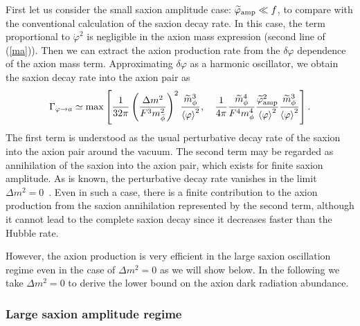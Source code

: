 \documentclass[12pt, a4paper]{article}
\begin{document}
First let us consider the small saxion amplitude case: $\widetilde \varphi_{\rm amp} \ll f$, to compare with the conventional calculation
of the saxion decay rate.
In this case, the term proportional to $\dot\varphi^2$ is negligible
in the axion mass expression (second line of  (\ref{ma})).
Then we can extract the axion production rate from the $\delta\varphi$ dependence of the axion mass term.
Approximating $\delta\varphi$ as a harmonic oscillator, we obtain the saxion decay rate into the axion pair as
\begin{align}
	\Gamma_{\varphi\to a} \simeq {\rm max}\left[\frac{1}{32\pi}\left(\frac{\Delta m^2}{F^3 m_{\bar\phi}^2}\right)^2 \frac{\widetilde m_\phi^3}{\left<\varphi\right>^2},
	~~~\frac{1}{4\pi}\frac{\widetilde m_\phi^4}{F^4 m_\phi^4} \frac{\widetilde\varphi_{\rm amp}^2}{\left<\varphi\right>^2} \frac{\widetilde m_\phi^3}{\left<\varphi\right>^2}   \right].
	\label{Gamma_small}
\end{align}
The first term is understood as the usual perturbative decay rate of the saxion into the axion pair around the vacuum.
The second term may be regarded as annihilation of the saxion into the axion pair, 
which exists for finite saxion amplitude.
As is known, the perturbative decay rate vanishes in the limit $\Delta m^2=0$~\cite{Chun:1995hc}.
Even in such a case, there is a finite contribution to the axion production from the saxion annihilation represented by the second term, although it cannot lead to the complete saxion decay since it decreases faster than the Hubble rate.

However, the axion production is very efficient in the large saxion oscillation regime even in the case of $\Delta m^2=0$ as we will show below.
In the following we take $\Delta m^2=0$ to derive the lower bound on the axion dark radiation abundance.




\subsubsection{Large saxion amplitude regime}
\end{document}
